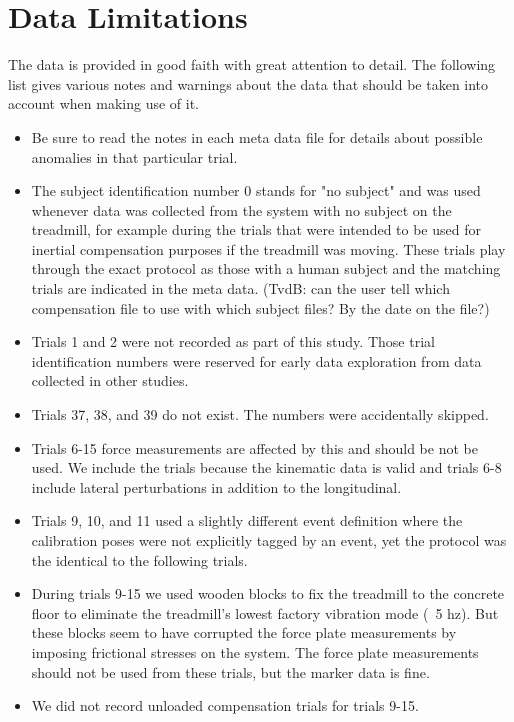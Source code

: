 \documentclass[fleqn,10pt]{wlpeerj}
\begin{document}
\section*{Data Limitations}
%
The data is provided in good faith with great attention to detail. The
following list gives various notes and warnings about the data that should be
taken into account when making use of it.
%
\begin{itemize}
  \item Be sure to read the notes in each meta data file for details about
    possible anomalies in that particular trial.
  \item The subject identification number 0 stands for "no subject" and was
    used whenever data was collected from the system with no subject on the
    treadmill, for example during the trials that were intended to be used for
    inertial compensation purposes if the treadmill was moving. These trials
    play through the exact protocol as those with a human subject and the
    matching trials are indicated in the meta data. (TvdB: can the user tell
    which compensation file to use with which subject files?  By the date on
    the file?)
  \item Trials 1 and 2 were not recorded as part of this study. Those trial
    identification numbers were reserved for early data exploration from data
    collected in other studies.
  \item Trials 37, 38, and 39 do not exist. The numbers were accidentally
    skipped.
  \item  Trials 6-15 force measurements are affected by this and should be not
    be used. We include the trials because the kinematic data is valid and
    trials 6-8 include lateral perturbations in addition to the longitudinal.
  \item Trials 9, 10, and 11 used a slightly different event definition where the
    calibration poses were not explicitly tagged by an event, yet the protocol
    was the identical to the following trials.
  \item During trials 9-15 we used wooden blocks to fix the treadmill to the
    concrete floor to eliminate the treadmill's lowest factory vibration mode
    (~5 hz). But these blocks seem to have corrupted the force plate
    measurements by imposing frictional stresses on the system. The force plate
    measurements should not be used from these trials, but the marker data is
    fine.
  \item We did not record unloaded compensation trials for trials 9-15.

\end{itemize}
\end{document}
